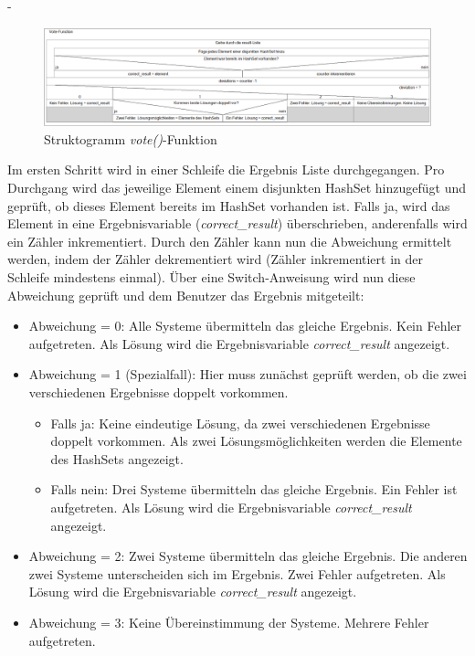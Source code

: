 -\begin{figure}[!htbp]
    \centering
    \includegraphics[width=1\linewidth]{images/vote_function_struktogramm.PNG}
    \caption{Struktogramm \textit{vote()}-Funktion}
    \label{fig:vote}
\end{figure}


 Im ersten Schritt wird in einer Schleife die Ergebnis Liste durchgegangen. Pro Durchgang wird das jeweilige Element einem disjunkten HashSet hinzugefügt und geprüft, ob dieses Element bereits im HashSet vorhanden ist. Falls ja, wird das Element in eine Ergebnisvariable (\textit{correct_result}) überschrieben, anderenfalls wird ein Zähler inkrementiert. Durch den Zähler kann nun die Abweichung ermittelt werden, indem der Zähler dekrementiert wird (Zähler inkrementiert in der Schleife mindestens einmal). Über eine Switch-Anweisung wird nun diese Abweichung geprüft und dem Benutzer das Ergebnis mitgeteilt:
 
 \begin{itemize}
     \item Abweichung = 0: Alle Systeme übermitteln das gleiche Ergebnis. Kein Fehler aufgetreten. Als Lösung wird die Ergebnisvariable \textit{correct_result} angezeigt.
     \item Abweichung = 1 (Spezialfall): Hier muss zunächst geprüft werden, ob die zwei verschiedenen Ergebnisse doppelt vorkommen.
     \begin{itemize}
         \item Falls ja: Keine eindeutige Lösung, da zwei verschiedenen Ergebnisse doppelt vorkommen. Als zwei Lösungsmöglichkeiten werden die Elemente des HashSets angezeigt.
         \item Falls nein: Drei Systeme übermitteln das gleiche Ergebnis. Ein Fehler ist aufgetreten. Als Lösung wird die Ergebnisvariable \textit{correct_result} angezeigt.
     \end{itemize}
     \item Abweichung = 2: Zwei Systeme übermitteln das gleiche Ergebnis. Die anderen zwei Systeme unterscheiden sich im Ergebnis. Zwei Fehler aufgetreten. Als Lösung wird die Ergebnisvariable \textit{correct_result} angezeigt.
     \item Abweichung = 3: Keine Übereinstimmung der Systeme. Mehrere Fehler aufgetreten.
\end{itemize}
	
